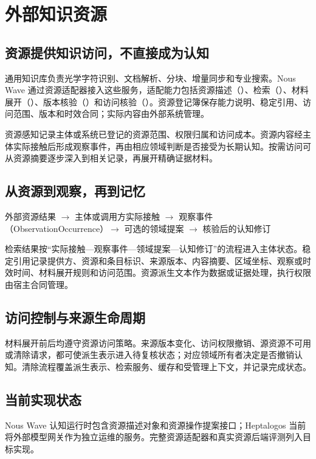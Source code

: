 \chapter{外部知识资源}

\section{资源提供知识访问，不直接成为认知}

通用知识库负责光学字符识别、文档解析、分块、增量同步和专业搜索。Nous Wave 通过资源适配器接入这些服务，适配能力包括资源描述（\texttt{}）、检索（\texttt{}）、材料展开（\texttt{}）、版本核验（\texttt{}）和访问核验（\texttt{}）。资源登记簿保存能力说明、稳定引用、访问范围、版本和时效合同；实际内容由外部系统管理。\cite{nous-research-package}

资源感知记录主体或系统已登记的资源范围、权限归属和访问成本。资源内容经主体实际接触后形成观察事件，再由相应领域判断是否接受为长期认知。按需访问可从资源摘要逐步深入到相关记录，再展开精确证据材料。

\section{从资源到观察，再到记忆}

\begin{center}
\small
外部资源结果 $\rightarrow$ 主体或调用方实际接触 $\rightarrow$
观察事件（ObservationOccurrence）$\rightarrow$ 可选的领域提案 $\rightarrow$
核验后的认知修订
\end{center}

检索结果按“实际接触—观察事件—领域提案—认知修订”的流程进入主体状态。稳定引用记录提供方、资源和条目标识、来源版本、内容摘要、区域坐标、观察或时效时间、材料展开规则和访问范围。资源派生文本作为数据或证据处理，执行权限由宿主合同管理。

\section{访问控制与来源生命周期}

材料展开前后均遵守资源访问策略。来源版本变化、访问权限撤销、源资源不可用或清除请求，都可使派生表示进入待复核状态；对应领域所有者决定是否撤销认知。清除流程覆盖派生表示、检索服务、缓存和受管理上下文，并记录完成状态。\cite{nous-research-package}

\section{当前实现状态}

Nous Wave 认知运行时包含资源描述对象和资源操作提案接口；Heptalogos 当前将外部模型网关作为独立运维的服务。完整资源适配器和真实资源后端评测列入目标实现。\cite{nous-code-snapshot,heptalogos-code-snapshot}
